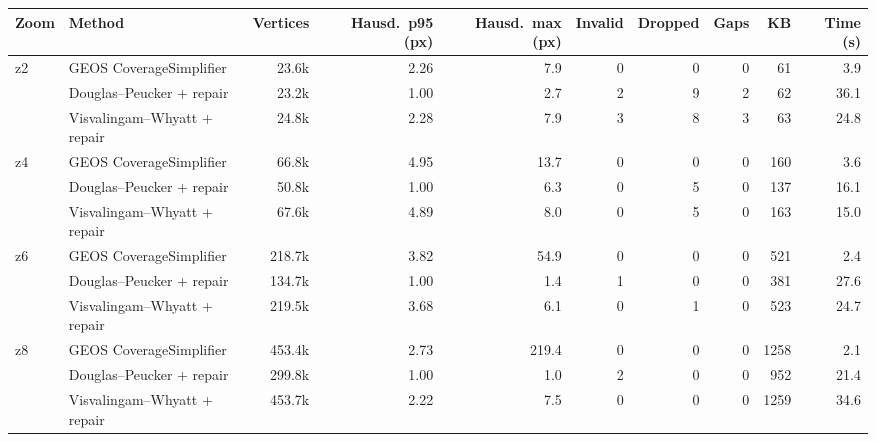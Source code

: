 \begin{tabular}{llrrrrrrrr}
\toprule
Zoom & Method & Vertices & Hausd.\ p95 (px) & Hausd.\ max (px) & Invalid & Dropped & Gaps & KB & Time (s) \\
\midrule
z2 & GEOS CoverageSimplifier & 23.6k & 2.26 & 7.9 & 0 & 0 & 0 & 61 & 3.9 \\
 & Douglas--Peucker + repair & 23.2k & 1.00 & 2.7 & 2 & 9 & 2 & 62 & 36.1 \\
 & Visvalingam--Whyatt + repair & 24.8k & 2.28 & 7.9 & 3 & 8 & 3 & 63 & 24.8 \\
\midrule
z4 & GEOS CoverageSimplifier & 66.8k & 4.95 & 13.7 & 0 & 0 & 0 & 160 & 3.6 \\
 & Douglas--Peucker + repair & 50.8k & 1.00 & 6.3 & 0 & 5 & 0 & 137 & 16.1 \\
 & Visvalingam--Whyatt + repair & 67.6k & 4.89 & 8.0 & 0 & 5 & 0 & 163 & 15.0 \\
\midrule
z6 & GEOS CoverageSimplifier & 218.7k & 3.82 & 54.9 & 0 & 0 & 0 & 521 & 2.4 \\
 & Douglas--Peucker + repair & 134.7k & 1.00 & 1.4 & 1 & 0 & 0 & 381 & 27.6 \\
 & Visvalingam--Whyatt + repair & 219.5k & 3.68 & 6.1 & 0 & 1 & 0 & 523 & 24.7 \\
\midrule
z8 & GEOS CoverageSimplifier & 453.4k & 2.73 & 219.4 & 0 & 0 & 0 & 1258 & 2.1 \\
 & Douglas--Peucker + repair & 299.8k & 1.00 & 1.0 & 2 & 0 & 0 & 952 & 21.4 \\
 & Visvalingam--Whyatt + repair & 453.7k & 2.22 & 7.5 & 0 & 0 & 0 & 1259 & 34.6 \\
\bottomrule
\end{tabular}